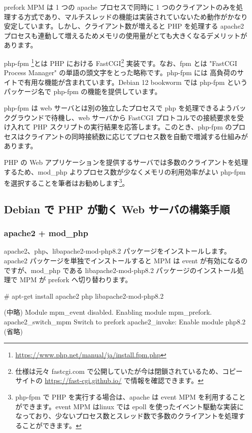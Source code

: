 \documentclass[mingoth,a4paper]{jsarticle}
\begin{document}
prefork MPM は 1 つの apache プロセスで同時に 1 つのクライアントのみを処理する方式であり、マルチスレッドの機能は実装されていないため動作がかなり安定しています。しかし、クライアント数が増えると PHP を処理する apache2 プロセスも連動して増えるためメモリの使用量がとても大きくなるデメリットがあります。


php-fpm \footnote{\url{https://www.php.net/manual/ja/install.fpm.php}}とは PHP における FastCGI\footnote{仕様は元々 fastcgi.com で公開していたが今は閉鎖されているため、コピーサイトの \url{https://fast-cgi.github.io/} で情報を確認できます。} 実装です。なお、fpm とは "FastCGI Process Manager" の単語の頭文字をとった略称です。php-fpm には 高負荷のサイトで有用な機能が含まれています。Debian 12 bookworm では php-fpm というパッケージ名で php-fpm の機能を提供しています。


php-fpm は web サーバとは別の独立したプロセスで php を処理できるようバックグラウンドで待機し、web サーバから FastCGI プロトコルでの接続要求を受け入れて PHP スクリプトの実行結果を応答します。このとき、php-fpm のプロセスはクライアントの同時接続数に応じてプロセス数を自動で増減する仕組みがあります。

PHP の Web アプリケーションを提供するサーバでは多数のクライアントを処理するため、mod\_php よりプロセス数が少なくメモリの利用効率がよい php-fpm を選択することを筆者はお勧めします\footnote{php-fpm で PHP を実行する場合は、apache は event MPM を利用することができます。event MPM はlinux では epoll を使ったイベント駆動な実装になっており、少ないプロセス数とスレッド数で多数のクライアントを処理することができます。}。


\subsection{Debian で PHP が動く Web サーバの構築手順}

\subsubsection{apache2 + mod\_php}

apache2、php、libapache2-mod-php8.2 パッケージをインストールします。
apache2 パッケージを単独でインストールすると MPM は event が有効になるのですが、mod\_php である libapache2-mod-php8.2 パッケージのインストール処理で MPM が prefork へ切り替わります。

\begin{commandline}
# apt-get install apache2 php libapache2-mod-php8.2

  (中略)
Module mpm_event disabled.
Enabling module mpm_prefork.
apache2_switch_mpm Switch to prefork
apache2_invoke: Enable module php8.2
  (省略)
\end{commandline}
\end{document}
